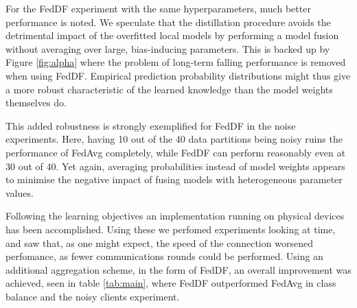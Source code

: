 \documentclass{article}
\begin{document}
For the FedDF experiment with the same hyperparameters, much better performance is noted.
We speculate that the distillation procedure avoids the detrimental impact of the overfitted local models by performing a model fusion without averaging over large, bias-inducing parameters.
This is backed up by Figure \ref{fig:alpha} where the problem of long-term falling performance is removed when using FedDF.
Empirical prediction probability distributions might thus give a more robust characteristic of the learned knowledge than the model weights themselves do.

This added robustness is strongly exemplified for FedDF in the noise experiments.
Here, having 10 out of the 40 data partitions being noisy ruins the performance of FedAvg completely, while FedDF can perform reasonably even at 30 out of 40.
Yet again, averaging probabilities instead of model weights appears to minimise the negative impact of fusing models with heterogeneous parameter values.



Following the learning objectives an implementation running on physical devices has been accomplished. Using these we perfomed experiments looking at time, and saw that, as one might expect, the speed of the connection worsened perfomance, as fewer communications rounds could be performed. Using an additional aggregation scheme, in the form of FedDF, an overall improvement was achieved, seen in table \ref{tab:main}, where FedDF outperformed FedAvg in class balance and the noisy clients experiment.  
\end{document}
